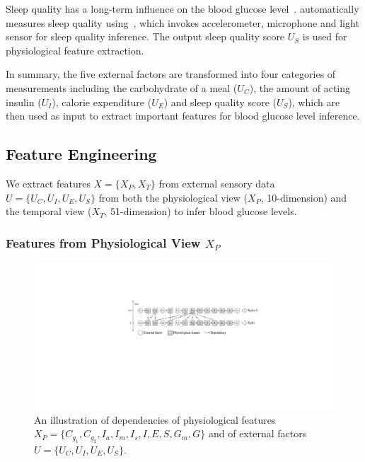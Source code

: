 Sleep quality has a long-term influence on the blood glucose level~\cite{bib:DRCP15:Iwasaki}.
\sysname automatically measures sleep quality using~\cite{bib:UbiComp14:Gu}, which invokes accelerometer, microphone and light sensor for sleep quality inference.
The output sleep quality score $U_S$ is used for physiological feature extraction.

In summary, the five external factors are transformed into four categories of measurements including the carbohydrate of a meal ($U_C$), the amount of acting insulin ($U_I$), calorie expenditure ($U_E$) and sleep quality score ($U_S$), which are then used as input to extract important features for blood glucose level inference.

\subsection{Feature Engineering}
\label{subsec:features}
We extract features $X=\{X_P, X_T\}$ from external sensory data $U=\{U_C, U_I, U_E, U_S\}$ from both the physiological view ($X_P$, 10-dimension) and the temporal view ($X_T$, 51-dimension) to infer blood glucose levels.

\subsubsection{Features from Physiological View $X_P$}
\label{subsubsec:physiological}
\begin{figure}[h]
  \centering
  \includegraphics[width=0.9\columnwidth]{./img/Physiological_correlation2.pdf}
  \caption{An illustration of dependencies of physiological features $X_P=\{C_{g_1}, C_{g_2}, I_{a}, I_{m}, I_{s}, I, E, S,  G_{m}, G\}$ and of external factors $U=\{U_C, U_I, U_E, U_S\}$.}
  \label{fig:phymodel}
\end{figure}

